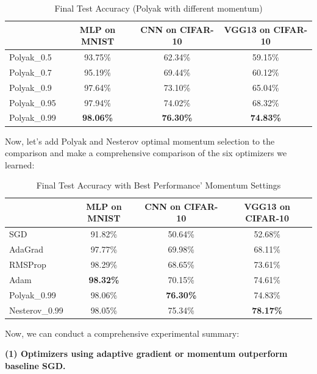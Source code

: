 \documentclass[12pt]{article}
\begin{document}
\begin{table}[H]
\centering
\caption{Final Test Accuracy (Polyak with different momentum)}
\label{tab:polyak_study}
\begin{tabular}{|l|c|c|c|}
\hline
             & MLP on MNIST & CNN on CIFAR-10 & VGG13 on CIFAR-10 \\ \hline
Polyak\_0.5   & 93.75\%      & 62.34\%         & 59.15\%           \\ \hline
Polyak\_0.7   & 95.19\%      & 69.44\%         & 60.12\%           \\ \hline
Polyak\_0.9   & 97.64\%      & 73.10\%         & 65.04\%           \\ \hline
Polyak\_0.95  & 97.94\%      & 74.02\%         & 68.32\%           \\ \hline
Polyak\_0.99  & \textbf{98.06\%} & \textbf{76.30\%}  & \textbf{74.83\%}    \\ \hline
\end{tabular}
\end{table}

Now, let's add Polyak and Nesterov optimal momentum selection to the comparison and make a comprehensive comparison of the six optimizers we learned:

\begin{table}[H]
\centering
\caption{Final Test Accuracy with Best Performance' Momentum Settings}
\label{tab:comprehensive_comparison}
\begin{tabular}{|l|c|c|c|}
\hline
             & MLP on MNIST & CNN on CIFAR-10 & VGG13 on CIFAR-10 \\ \hline
SGD          & 91.82\%      & 50.64\%         & 52.68\%           \\ \hline
AdaGrad      & 97.77\%      & 69.98\%         & 68.11\%           \\ \hline
RMSProp      & 98.29\%      & 68.65\%         & 73.61\%           \\ \hline
Adam         & \textbf{98.32\%} & 70.15\%         & 74.61\%    \\ \hline
Polyak\_0.99   & 98.06\%      & \textbf{76.30\%}  & 74.83\%           \\ \hline
Nesterov\_0.99 & 98.05\%      & 75.34\%         & \textbf{78.17\%}           \\ \hline
\end{tabular}
\end{table}

Now, we can conduct a comprehensive experimental summary:

\textbf{(1) Optimizers using adaptive gradient or momentum outperform baseline SGD.}
\end{document}
